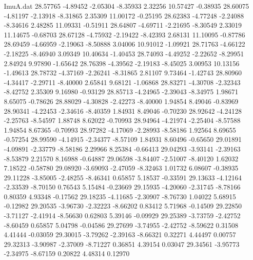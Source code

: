 \begin{filecontents}{ImuA.dat}
  28.57765   -4.89452   -2.05304   -8.35933    2.32256   10.57427   -0.38935
  28.60075   -4.81197   -2.13918   -8.31865    2.35309   11.00172   -0.25195
  28.62383   -4.77248   -2.24088   -8.34616    2.48285   11.09331   -0.51911
  28.64807   -4.69711   -2.21695   -8.30549    2.33019   11.14675   -0.68703
  28.67128   -4.75932   -2.19422   -8.42393    2.68131   11.10095   -0.87786
  28.69459   -4.66959   -2.19063   -8.50888    3.04006   10.91012   -1.09921
  28.71763   -4.66122   -2.18225   -8.46940    3.09349   10.40634   -1.40453
  28.74093   -4.49252   -2.22652   -8.29951    2.84924    9.97890   -1.65642
  28.76398   -4.39562   -2.19183   -8.45025    3.00953   10.13156   -1.49613
  28.78732   -4.37169   -2.26241   -8.31865    2.81107    9.73464   -1.42743
  28.80960   -4.34417   -2.29711   -8.40000    2.65841    9.68121   -1.06868
  28.83271   -4.30708   -2.32343   -8.42752    2.35309    9.16980   -0.93129
  28.85713   -4.24965   -2.39043   -8.34975    1.98671    8.65075   -0.78626
  28.88029   -4.30828   -2.42273   -8.40000    1.94854    8.49046   -0.83969
  28.90341   -4.22453   -2.34616   -8.40359    1.84931    8.49046   -0.70230
  28.92642   -4.24128   -2.25763   -8.54597    1.88748    8.62022   -0.70993
  28.94964   -4.21974   -2.25404   -8.57588    1.94854    8.67365   -0.70993
  28.97282   -4.17069   -2.28993   -8.58186    1.92564    8.69655   -0.57254
  28.99590   -4.14915   -2.34377   -8.57109    1.84931    8.60496   -0.65650
  29.01891   -4.09891   -2.33779   -8.58186    2.29966    8.25384   -0.66413
  29.04293   -3.93141   -2.39163   -8.53879    2.21570    8.16988   -0.64887
  29.06598   -3.84407   -2.51007   -8.40120    1.62032    7.18522   -0.58780
  29.08920   -3.69093   -2.47059   -8.32463    1.01732    6.08607   -0.38935
  29.11228   -3.85005   -2.48255   -8.46341    0.65857    5.18537   -0.33591
  29.13633   -4.12164   -2.33539   -8.70150    0.76543    5.15484   -0.23669
  29.15935   -4.20060   -2.31745   -8.78166    0.80359    4.93348   -0.17562
  29.18235   -4.11685   -2.30907   -8.76730    1.04022    5.68915   -0.12982
  29.20535   -3.96730   -2.32223   -8.66202    0.83412    5.71968   -0.14509
  29.22850   -3.71127   -2.41914   -8.56630    0.62803    5.39146   -0.09929
  29.25389   -3.73759   -2.42752   -8.60459    0.65857    5.04798   -0.04586
  29.27699   -3.74955   -2.42752   -8.59622    0.31508    4.41444   -0.03059
  29.30015   -3.79262   -2.39163   -8.66321    0.32271    4.44497    0.00757
  29.32313   -3.90987   -2.37009   -8.71227    0.36851    4.39154    0.03047
  29.34561   -3.95773   -2.34975   -8.67159    0.20822    4.48314    0.12970

\end{filecontents}
